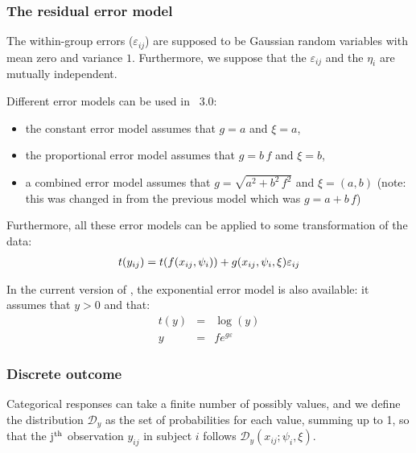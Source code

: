 \subsubsection*{The residual error model} %
The within-group errors ($\varepsilon_{ij}$)  are  supposed  to be  Gaussian random variables  with mean  zero and variance $1$.
Furthermore, we suppose that the $\varepsilon_{ij}$ and the $\eta_{i}$ are mutually independent.

Different error models can be used in \saemix~3.0:
\begin{itemize}
\item the constant error model assumes that $g=a$ and $\xi=a$,
\item the proportional error model assumes that $g=b\,f$ and $\xi=b$,
\item a combined error model assumes that $g=\sqrt{a^2+b^2\,f^2}$ and $\xi=(a,b)$ (note: this was changed in from the previous model which was $g=a+b\,f$)
\end{itemize}

Furthermore, all these error models can be applied to some transformation of the data:
\begin{eqnarray}\label{def_t}
t(y_{ij})=t(f(x_{ij},{\psi_i}))+ g(x_{ij},{\psi_i},\xi)\varepsilon_{ij}
\end{eqnarray}

In the current version of \saemix, the exponential error model is also available: it assumes that $y>0$ and that:
\begin{eqnarray*}
t(y) &=& \log(y) \\
y&=&f e^{g\varepsilon}
\end{eqnarray*}

\subsubsection{Discrete outcome}

Categorical responses can take a finite number of possibly values, and we define the distribution $\mathcal{D}_y$ as the set of probabilities for each value, summing up to 1, so that the j$^{\rm th}$ observation $y_{ij}$ in subject $i$ follows $\mathcal{D}_y\left(x_{ij}; \psi_i, \xi \right)$. 

